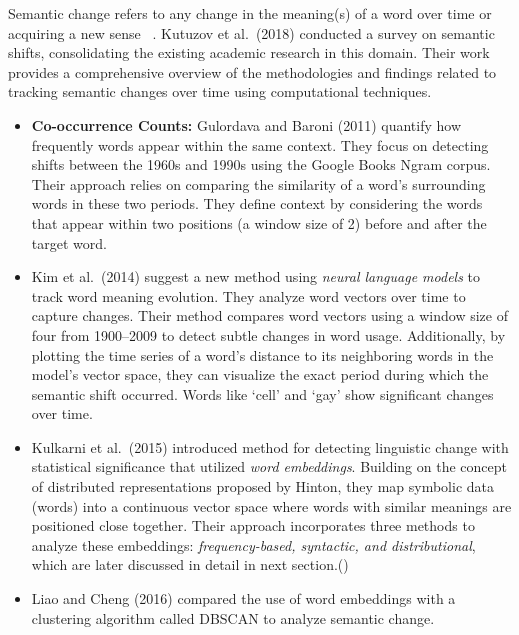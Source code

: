 Semantic change refers to any change in the meaning(s) of a word over time or acquiring a new sense ~\cite{gulordava-baroni-2011-distributional, 10.1162/opmi_a_00081}.
Kutuzov et al.\ (2018) conducted a survey on semantic shifts, consolidating the existing academic research in this domain.
Their work provides a comprehensive overview of the methodologies and findings related to tracking semantic changes over time using computational techniques.
\vspace{0mm}
\begin{itemize}
    \item \textbf{Co-occurrence Counts:} Gulordava and Baroni (2011) quantify how frequently words appear within the same context.
        They focus on detecting shifts between the 1960s and 1990s using the Google Books Ngram corpus.
        Their approach relies on comparing the similarity of a word's surrounding words in these two periods.
        They define context by considering the words that appear within two positions (a window size of 2) before and after the target word.
    \item {} Kim et al.\ (2014) suggest a new method using \emph{neural language models} to track word meaning evolution.
        They analyze word vectors over time to capture changes.
        Their method compares word vectors using a window size of four from 1900--2009 to detect subtle changes in word usage.
        Additionally, by plotting the time series of a word’s distance to its neighboring words in the model’s vector space, they can visualize the exact period during which the semantic shift occurred.
        Words like `cell' and `gay' show significant changes over time.
    \item {} Kulkarni et al.\ (2015) introduced method for detecting linguistic change with statistical significance that utilized \emph{word embeddings}.
        Building on the concept of distributed representations proposed by Hinton, they map symbolic data (words) into a continuous vector space where words with similar meanings are positioned close together.
        Their approach incorporates three methods to analyze these embeddings: \emph{frequency-based, syntactic, and distributional}, which are later discussed in  detail in next section.()
    \item {} Liao and Cheng (2016) compared the use of word embeddings with a clustering algorithm called DBSCAN to analyze semantic change.

\end{itemize}
